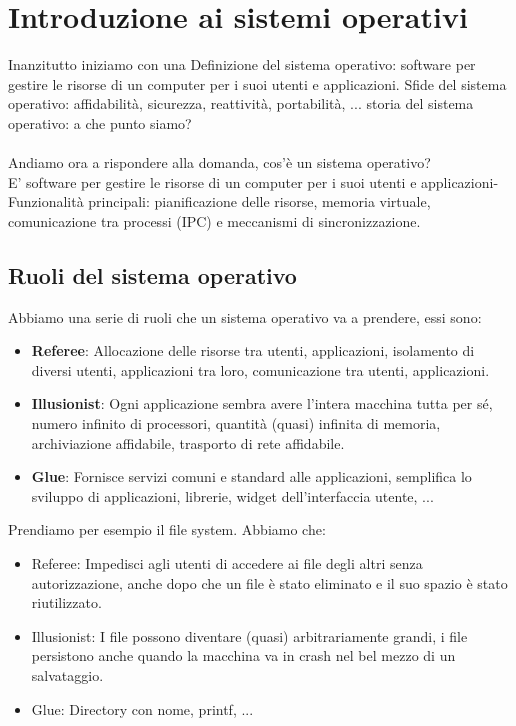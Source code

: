 \newpage
\section{Introduzione ai sistemi operativi}
Inanzitutto iniziamo con una Definizione del sistema operativo: software per gestire le risorse di un computer per i suoi utenti e applicazioni. 
Sfide del sistema operativo: affidabilità, sicurezza, reattività, portabilità, ... storia del sistema operativo: a che punto siamo?
\\\\Andiamo ora a rispondere alla domanda, cos'è un sistema operativo?\\
E' software per gestire le risorse di un computer per i suoi utenti e applicazioni- Funzionalità principali: pianificazione delle risorse, memoria virtuale, comunicazione tra processi (IPC) 
e meccanismi di sincronizzazione.

\subsection{Ruoli del sistema operativo}
Abbiamo una serie di ruoli che un sistema operativo va a prendere, essi sono:
\begin{itemize}
    \item \textbf{Referee}: Allocazione delle risorse tra utenti, applicazioni, isolamento di diversi utenti, applicazioni tra loro, comunicazione tra utenti, applicazioni.
    \item \textbf{Illusionist}: Ogni applicazione sembra avere l'intera macchina tutta per sé, numero infinito di processori, quantità (quasi) infinita di memoria, archiviazione affidabile, trasporto di rete affidabile.
    \item \textbf{Glue}: Fornisce servizi comuni e standard alle applicazioni, semplifica lo sviluppo di applicazioni, librerie, widget dell'interfaccia utente, ...
\end{itemize}

\begin{example}
    Prendiamo per esempio il file system. Abbiamo che:
    \begin{itemize}
        \item Referee: Impedisci agli utenti di accedere ai file degli altri senza autorizzazione, anche dopo che un file è stato eliminato e il suo spazio è stato riutilizzato.
        \item Illusionist: I file possono diventare (quasi) arbitrariamente grandi, i file persistono anche quando la macchina va in crash nel bel mezzo di un salvataggio.
        \item Glue: Directory con nome, printf, ...
    \end{itemize}
\end{example}